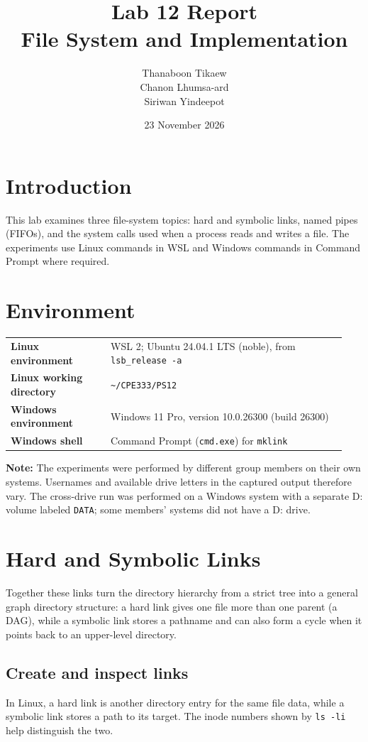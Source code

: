 \documentclass[a4paper,11pt]{article}
\title{\textbf{Lab 12 Report}\\[3pt]
       \large File System and Implementation}
\author{
Thanaboon Tikaew \quad 67070501021\\
Chanon Lhumsa-ard \quad 67070501059\\
Siriwan Yindeepot \quad 67070501075
}
\date{23 November 2026}
\begin{document}
\maketitle
\tableofcontents
\newpage

\section{Introduction}
This lab examines three file-system topics: hard and symbolic links, named pipes
(FIFOs), and the system calls used when a process reads and writes a file. The
experiments use Linux commands in WSL and Windows commands in Command Prompt
where required.

\section{Environment}
\begin{tabular}{>{\bfseries}p{0.28\linewidth}p{0.66\linewidth}}
Linux environment & WSL 2; Ubuntu 24.04.1 LTS (noble), from \texttt{lsb\_release -a} \\
Linux working directory & \texttt{\textasciitilde/CPE333/PS12} \\
Windows environment & Windows 11 Pro, version 10.0.26300 (build 26300) \\
Windows shell & Command Prompt (\texttt{cmd.exe}) for \texttt{mklink} \\
\end{tabular}

\noindent\textbf{Note:} The experiments were performed by different group
members on their own systems. Usernames and available drive letters in the
captured output therefore vary. The cross-drive run was performed on a Windows
system with a separate D: volume labeled \texttt{DATA}; some members' systems
did not have a D: drive.

\section{Hard and Symbolic Links}

Together these links turn the directory hierarchy from a strict tree into a
general graph directory structure: a hard link gives one file more than one
parent (a DAG), while a symbolic link stores a pathname and can also form a
cycle when it points back to an upper-level directory.

\subsection{Create and inspect links}
In Linux, a hard link is another directory entry for the same file data, while
a symbolic link stores a path to its target. The inode numbers shown by
\texttt{ls -li} help distinguish the two.
\end{document}

